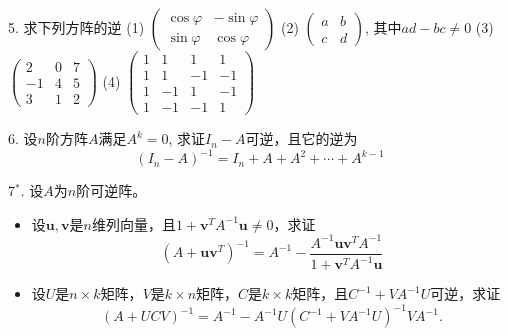 \begin{frame}

5. 求下列方阵的逆
\newline \vspace{0.5em}
(1) $\begin{pmatrix} \cos\varphi & -\sin\varphi \\ \sin\varphi & \cos\varphi \end{pmatrix}$ \quad (2) $\begin{pmatrix} a & b \\ c & d \end{pmatrix}$, 其中$ad-bc\neq 0$
\newline \vspace{0.5em}
(3) $\begin{pmatrix} 2 & 0 & 7 \\ -1 & 4 & 5 \\ 3 & 1 & 2 \end{pmatrix}$ \qquad\quad (4) $\begin{pmatrix} 1 & 1 & 1 & 1 \\ 1 & 1 & -1 & -1 \\ 1 & -1 & 1 & -1 \\ 1 & -1 & -1 & 1 \end{pmatrix}$

\vspace{1em}

6. 设$n$阶方阵$A$满足$A^k = 0$, 求证$I_n-A$可逆，且它的逆为
$$(I_n-A)^{-1} = I_n + A + A^2 + \cdots + A^{k-1}$$

\end{frame}


\begin{frame}

7$^*$. 设$A$为$n$阶可逆阵。
\begin{itemize}
\item[(1)] 设$\mathbf{u}, \mathbf{v}$是$n$维列向量，且$1 + \mathbf{v}^T A^{-1} \mathbf{u} \neq 0$，求证
$$(A+\mathbf{u}\mathbf{v}^T)^{-1} = A^{-1} - \frac{A^{-1} \mathbf{u} \mathbf{v}^T A^{-1}}{1 + \mathbf{v}^T A^{-1} \mathbf{u}}$$
\item[(2)] 设$U$是$n\times k$矩阵，$V$是$k\times n$矩阵，$C$是$k\times k$矩阵，且$ C^{-1}+VA^{-1}U$可逆，求证
$$ \left(A+UCV \right)^{-1} = A^{-1} - A^{-1}U \left(C^{-1}+VA^{-1}U \right)^{-1} VA^{-1}.$$
\end{itemize}

\end{frame}

